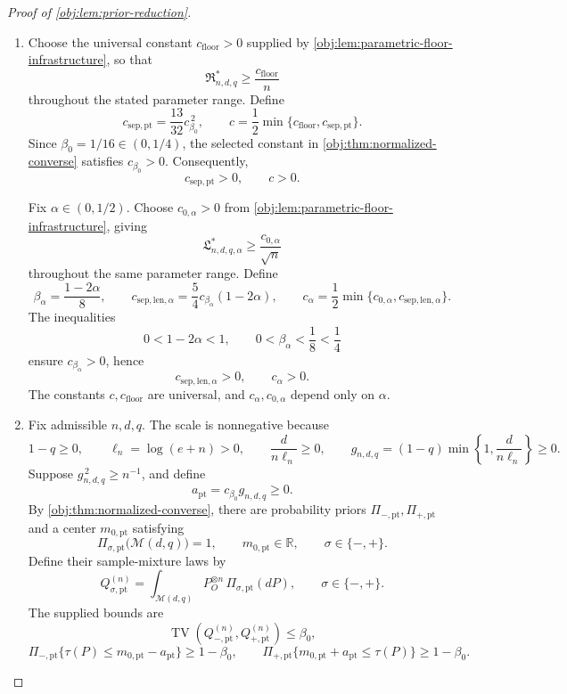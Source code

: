 \begin{proof}[Proof of \cref{obj:lem:prior-reduction}]
\begin{enumerate}
\item Choose the universal constant \(c_{\mathrm{floor}}>0\) supplied by
\cref{obj:lem:parametric-floor-infrastructure}, so that
\[
\mathfrak R^*_{n,d,q}\ge \frac{c_{\mathrm{floor}}}{n}
\]
throughout the stated parameter range. Define
\[
c_{\mathrm{sep,pt}}
=\frac{13}{32}c_{\beta_0}^{\,2},
\qquad
c=\frac12\min\{c_{\mathrm{floor}},c_{\mathrm{sep,pt}}\}.
\]
Since \(\beta_0=1/16\in(0,1/4)\), the selected constant in
\cref{obj:thm:normalized-converse} satisfies \(c_{\beta_0}>0\).
Consequently,
\[
c_{\mathrm{sep,pt}}>0,
\qquad c>0.
\]

Fix \(\alpha\in(0,1/2)\). Choose \(c_{0,\alpha}>0\) from
\cref{obj:lem:parametric-floor-infrastructure}, giving
\[
\mathfrak L^*_{n,d,q,\alpha}
\ge \frac{c_{0,\alpha}}{\sqrt n}
\]
throughout the same parameter range. Define
\[
\beta_\alpha=\frac{1-2\alpha}{8},
\qquad
c_{\mathrm{sep,len},\alpha}
=\frac54c_{\beta_\alpha}(1-2\alpha),
\qquad
c_\alpha
=\frac12\min\{c_{0,\alpha},c_{\mathrm{sep,len},\alpha}\}.
\]
The inequalities
\[
0<1-2\alpha<1,
\qquad
0<\beta_\alpha<\frac18<\frac14
\]
ensure \(c_{\beta_\alpha}>0\), hence
\[
c_{\mathrm{sep,len},\alpha}>0,
\qquad c_\alpha>0.
\]
The constants \(c,c_{\mathrm{floor}}\) are universal, and \(c_\alpha,c_{0,\alpha}\)
depend only on \(\alpha\).

\item Fix admissible \(n,d,q\). The scale is nonnegative because
\[
1-q\ge0,\qquad
\ell_n=\log(e+n)>0,\qquad
\frac{d}{n\ell_n}\ge0,
\qquad
g_{n,d,q}=(1-q)\min\left\{1,\frac{d}{n\ell_n}\right\}\ge0.
\]
Suppose \(g_{n,d,q}^{\,2}\ge n^{-1}\), and define
\[
a_{\mathrm{pt}}=c_{\beta_0}g_{n,d,q}\ge0.
\]
By \cref{obj:thm:normalized-converse}, there are probability priors
\(\Pi_{-,\mathrm{pt}},\Pi_{+,\mathrm{pt}}\) and a center
\(m_{0,\mathrm{pt}}\) satisfying
\[
\Pi_{\sigma,\mathrm{pt}}\bigl(\mathcal M(d,q)\bigr)=1,
\qquad
m_{0,\mathrm{pt}}\in\mathbb R,
\qquad \sigma\in\{-,+\}.
\]
Define their sample-mixture laws by
\[
Q_{\sigma,\mathrm{pt}}^{(n)}
=\int_{\mathcal M(d,q)}P_O^{\otimes n}\,
  \Pi_{\sigma,\mathrm{pt}}(dP),
\qquad \sigma\in\{-,+\}.
\]
The supplied bounds are
\[
\operatorname{TV}\!\left(
Q_{-,\mathrm{pt}}^{(n)},Q_{+,\mathrm{pt}}^{(n)}
\right)\le\beta_0,
\]
\[
\Pi_{-,\mathrm{pt}}\{\tau(P)\le m_{0,\mathrm{pt}}-a_{\mathrm{pt}}\}
\ge1-\beta_0,
\qquad
\Pi_{+,\mathrm{pt}}\{m_{0,\mathrm{pt}}+a_{\mathrm{pt}}\le\tau(P)\}
\ge1-\beta_0.
\]


\end{enumerate}
\end{proof}
